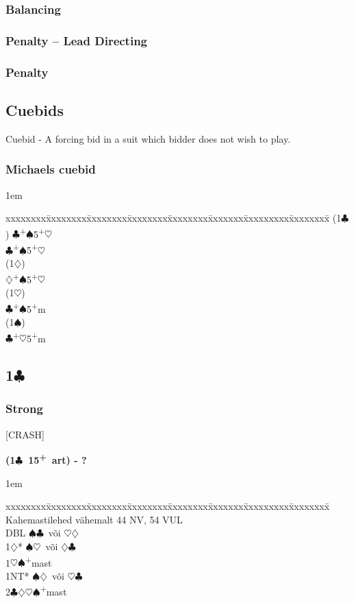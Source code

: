\documentclass[10pt]{article}
\renewcommand{\c}{$\clubsuit$}
\renewcommand{\d}{$\diamondsuit$}
\newcommand{\h}{$\heartsuit$}
\newcommand{\s}{$\spadesuit$}
\newcommand{\p}{\textsuperscript{+}}
\newcommand{\x}{DBL}
\newenvironment{bidtable}[1][]
{\textbf{#1}
  \begin{adjustwidth}{1em}{}
    \addvspace{2pt}
    \begin{tabbing}
      xxxxxxxx\=xxxxxxxx\=xxxxxxxx\=xxxxxxxx\=xxxxxxxx\=xxxxxxx\=xxxxxxxxx\=xxxxxxxx\=\kill}
{\end{tabbing}\end{adjustwidth}\bigskip}%
\newcommand{\pdfc}{\texorpdfstring{\c{}}{C}}
\begin{document}
\subsubsection{Balancing}

\subsubsection{Penalty -- Lead Directing}

\subsubsection{Penalty}




\subsection{Cuebids}
Cuebid - A forcing bid in a suit which bidder does not wish to play.

\subsubsection{Michaels cuebid}

\begin{bidtable}
(1\c) \c {}\p\s 5\p\h                   \\
      \c {}\p\s 5\p\h \\
(1\d) \>                    \\
      \d {}\p\s 5\p\h \\
(1\h) \>                    \\
      \c {}\p\s 5\p m \\
(1\s) \>                    \\
      \c {}\p\h 5\p m \\
\end{bidtable}
\subsection{1\pdfc}

\subsubsection{Strong}

[CRASH]

\begin{bidtable}[(1\c\ 15\p\ art) - ?]
Kahemastilehed vähemalt 44 NV, 54 VUL \\
\x        \> \s\c\ või \h\d\          \\
1\d*      \> \s\h\ või \d\c           \\
1\h\s     {}\p mast                 \\
1NT*      \> \s\d\ või \h\c\          \\
2\c\d\h\s {}\p mast
\end{bidtable}
\end{document}
